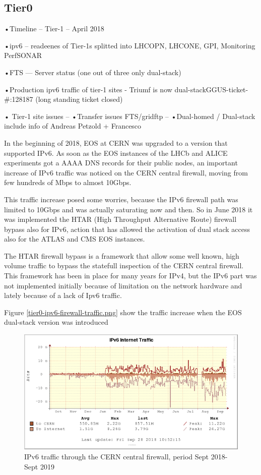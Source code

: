 \subsection{Tier0}
•Timeline  -- Tier-1 – April 2018

•ipv6      -- readeenes of Tier-1s splitted into LHCOPN, LHCONE, GPI, Monitoring PerfSONAR

•FTS       --- Server status (one out of three only dual-stack)

•Production ipv6 traffic of tier-1 sites
- Triumf is now dual-stackGGUS-ticket-#:128187 (long standing ticket closed)

• Tier-1 site issues
--  •Transfer issues FTS/gridftp
--  •Dual-homed / Dual-stack  include info of Andreas Petzold + Francesco

In the beginning of 2018, EOS at CERN was upgraded to a version that supported IPv6. 
As soon as the EOS instances of the LHCb and ALICE experiments got a AAAA DNS records for their public nodes, an important increase of IPv6 traffic was noticed on the CERN central firewall, moving from few hundreds of Mbps to almost 10Gbps.

This traffic increase posed some worries, because the IPv6 firewall path was limited to 10Gbps and was actually saturating now and then. So in June 2018 it was implemented the HTAR (High Throughput Alternative Route) firewall bypass also for IPv6, action that has allowed the activation of dual stack access also for the ATLAS and CMS EOS instances. 

The HTAR firewall bypass is a framework that allow some well known, high volume traffic to bypass the statefull inspection of the CERN central firewall. This framework has been in place for many years for IPv4, but the IPv6 part was not implemented initially because of limitation on the network hardware and lately because of a lack of Ipv6 traffic.

Figure \ref{tier0-ipv6-firewall-traffic.png} show the traffic increase when the EOS dual-stack version was introduced

\begin{figure}[h!]
\centering
\includegraphics[width=5.6 in]{tier0-ipv6-firewall-traffic.png}
\caption{IPv6 traffic through the CERN central firewall, period Sept 2018-Sept 2019}
\label{fig:tier0-traffic}
\end{figure}
